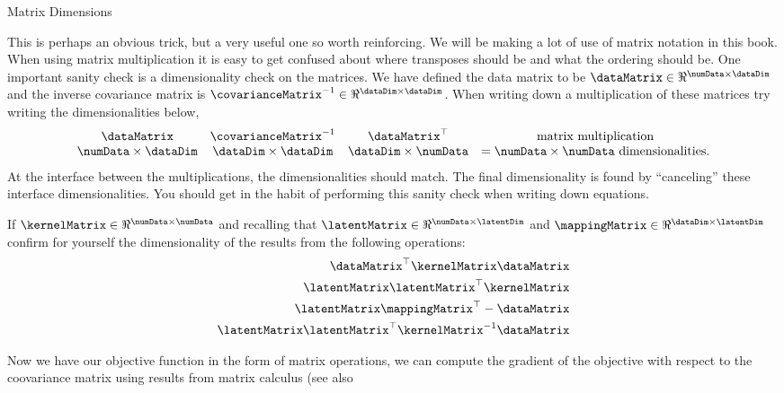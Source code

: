 \begin{tipfloat}
  \caption{Matrix Dimensions}\label{tip:matrixMultiplication}

  \boxfontsize This is perhaps an obvious trick, but a very useful one
  so worth reinforcing. We will be making a lot of use of matrix
  notation in this book. When using matrix multiplication it is easy to
  get confused about where transposes should be and what the ordering
  should be. One important sanity check is a dimensionality check on the
  matrices. We have defined the data matrix to be $\dataMatrix \in
  \Re^{\numData \times \dataDim}$ and the inverse covariance matrix is
  $\covarianceMatrix^{-1} \in \Re^{\dataDim\times \dataDim}$. When
  writing down a multiplication of these matrices try writing the
  dimensionalities below,
  \begin{align*}
    \begin{array}{cccc}
      \dataMatrix &  \covarianceMatrix^{-1} &\dataMatrix^\top & \text{matrix\ multiplication}\\
      \numData \times \dataDim & \dataDim \times \dataDim & \dataDim \times \numData & = \numData \times \numData\ \text{dimensionalities}.
    \end{array}
  \end{align*}
  At the interface between the multiplications, the dimensionalities
  should match. The final dimensionality is found by ``canceling''
  these interface dimensionalities. You should get in the habit of
  performing this sanity check when writing down equations.

  If $\kernelMatrix \in \Re^{\numData\times\numData}$ and recalling
  that $\latentMatrix \in \Re^{\numData\times\latentDim}$ and
  $\mappingMatrix \in \Re^{\dataDim\times \latentDim}$ confirm for
  yourself the dimensionality of the results from the following
  operations:
  \begin{align*}
    \dataMatrix^\top \kernelMatrix \dataMatrix \\
    \latentMatrix\latentMatrix^\top \kernelMatrix \\
    \latentMatrix\mappingMatrix^\top - \dataMatrix\\
    \latentMatrix\latentMatrix^\top\kernelMatrix^{-1}\dataMatrix
  \end{align*}
\end{tipfloat}
Now we have our objective function in the form of matrix operations,
we can compute the gradient of the objective with respect to the
coovariance matrix using results from matrix calculus (see also
